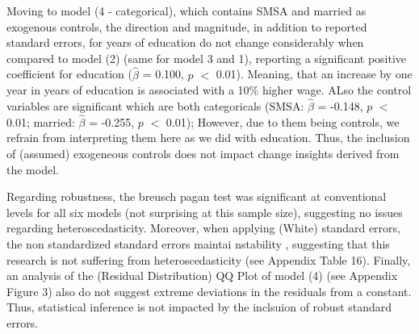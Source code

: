 \documentclass[a4paper]{article}
\begin{document}
Moving to model (4 - categorical), which contains SMSA and married as exogenous controls, the direction and magnitude, in addition to reported standard errors, for years of education do not change considerably when compared to model (2) (same for model 3 and 1), reporting a significant positive coefficient for education ($\hat{\beta}$ = 0.100, $p$ $<$ 0.01). Meaning, that an increase by one year in years of education is associated with a 10\% higher wage. ALso the control variables are significant which are both categoricals (SMSA: $\hat{\beta}$ = -0.148, $p$ $<$ 0.01; married: $\hat{\beta}$ = -0.255, $p$ $<$ 0.01); However, due to them being controls, we refrain from interpreting them here as we did with education. Thus, the inclusion of (assumed) exogeneous controls does not impact change insights derived from the model.

Regarding robustness, the breusch pagan test was significant at conventional levels for all six models (not surprising at this sample size), suggesting no issues regarding heteroscedasticity. Moreover, when applying (White) standard errors, the non standardized standard errors maintai nstability , suggesting that this research is not suffering from heteroscedasticity (see Appendix Table 16). Finally, an analysis of the (Residual Distribution) QQ Plot of model (4) (see Appendix Figure 3) also do not suggest extreme deviations in the residuals from a constant. Thus, statistical inference is not impacted by the inclsuion of robust standard errors. 
\end{document}
